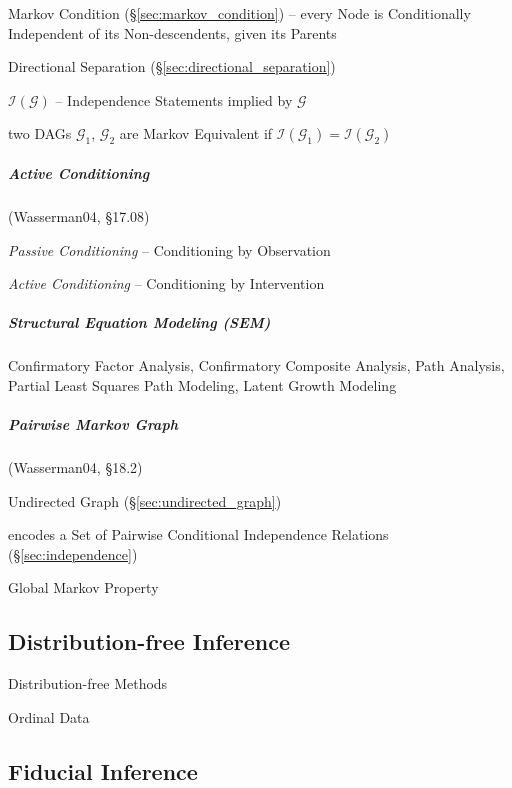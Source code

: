 Markov Condition (\S\ref{sec:markov_condition}) -- every Node is Conditionally
Independent of its Non-descendents, given its Parents

Directional Separation (\S\ref{sec:directional_separation})

$\mathcal{I}(\mathcal{G})$ -- Independence Statements implied by $\mathcal{G}$

two DAGs $\mathcal{G}_1$, $\mathcal{G}_2$ are Markov Equivalent if
$\mathcal{I}(\mathcal{G}_1) = \mathcal{I}(\mathcal{G}_2)$



\subparagraph{Active Conditioning}\label{sec:active_conditioning}\hfill

(Wasserman04, \S17.08)

\emph{Passive Conditioning} -- Conditioning by Observation

\emph{Active Conditioning} -- Conditioning by Intervention



\subparagraph{Structural Equation Modeling (SEM)}\label{sec:sem}\hfill


Confirmatory Factor Analysis, Confirmatory Composite Analysis, Path Analysis,
Partial Least Squares Path Modeling, Latent Growth Modeling



\subparagraph{Pairwise Markov Graph}\label{sec:pairwise_markov}\hfill

(Wasserman04, \S18.2)

Undirected Graph (\S\ref{sec:undirected_graph})

encodes a Set of Pairwise Conditional Independence Relations
(\S\ref{sec:independence})

Global Markov Property



\subsection{Distribution-free Inference}\label{sec:distribution_free}

Distribution-free Methods

Ordinal Data



\subsection{Fiducial Inference}\label{sec:fiducial_inference}

